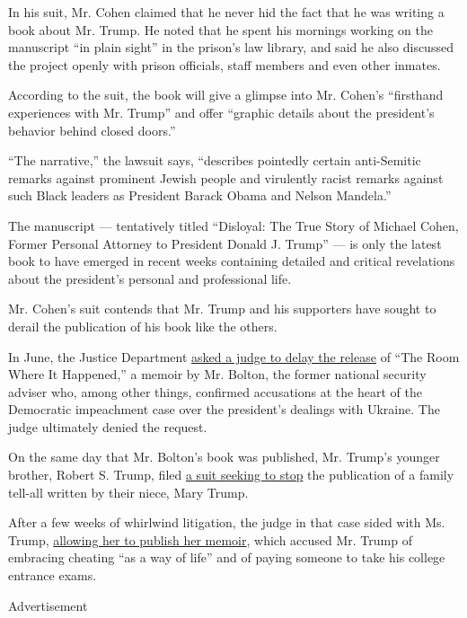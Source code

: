 In his suit, Mr. Cohen claimed that he never hid the fact that he was
writing a book about Mr. Trump. He noted that he spent his mornings
working on the manuscript ``in plain sight'' in the prison's law
library, and said he also discussed the project openly with prison
officials, staff members and even other inmates.

According to the suit, the book will give a glimpse into Mr. Cohen's
``firsthand experiences with Mr. Trump'' and offer ``graphic details
about the president's behavior behind closed doors.''

``The narrative,'' the lawsuit says, ``describes pointedly certain
anti-Semitic remarks against prominent Jewish people and virulently
racist remarks against such Black leaders as President Barack Obama and
Nelson Mandela.''

The manuscript --- tentatively titled ``Disloyal: The True Story of
Michael Cohen, Former Personal Attorney to President Donald J. Trump''
--- is only the latest book to have emerged in recent weeks containing
detailed and critical revelations about the president's personal and
professional life.

Mr. Cohen's suit contends that Mr. Trump and his supporters have sought
to derail the publication of his book like the others.

In June, the Justice Department
\href{https://www.nytimes3xbfgragh.onion/2020/06/16/us/politics/john-bolton-book-publication.html}{asked
a judge to delay the release} of ``The Room Where It Happened,'' a
memoir by Mr. Bolton, the former national security adviser who, among
other things, confirmed accusations at the heart of the Democratic
impeachment case over the president's dealings with Ukraine. The judge
ultimately denied the request.

On the same day that Mr. Bolton's book was published, Mr. Trump's
younger brother, Robert S. Trump, filed
\href{https://www.nytimes3xbfgragh.onion/2020/06/23/us/politics/mary-trump-book-court.html}{a
suit seeking to stop} the publication of a family tell-all written by
their niece, Mary Trump.

After a few weeks of whirlwind litigation, the judge in that case sided
with Ms. Trump,
\href{https://www.nytimes3xbfgragh.onion/2020/07/07/us/politics/mary-trump-book.html}{allowing
her to publish her memoir}, which accused Mr. Trump of embracing
cheating ``as a way of life'' and of paying someone to take his college
entrance exams.

Advertisement


